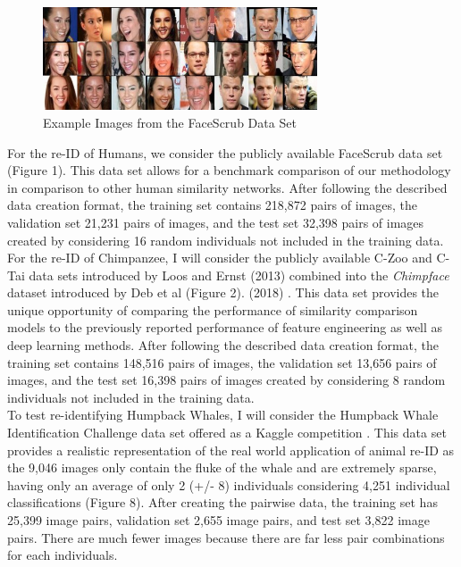 \documentclass[11pt]{article}
\begin{document}
\begin{figure}
  \begin{flushright}
    \includegraphics[width=3.2in]{FaceScrub.jpg}
  \end{flushright}
  \caption{Example Images from the FaceScrub Data Set}
\end{figure}

\noindent
For the re-ID of Humans, we consider the publicly available FaceScrub data set \cite{ng2014data} (Figure 1). This data set allows for a benchmark comparison of our methodology in comparison to other human similarity networks. After following the described data creation format, the training set contains 218,872 pairs of images, the validation set 21,231 pairs of images, and the test set 32,398 pairs of images created by considering 16 random individuals not included in the training data.  
\newline
\\
For the re-ID of Chimpanzee, I will consider the publicly available C-Zoo and C-Tai data sets introduced by Loos and Ernst (2013) combined into the \textit{Chimpface} dataset introduced by Deb et al (Figure 2). (2018) \cite{loos2013automated, deb2018face}. This data set provides the unique opportunity of comparing the performance of similarity comparison models to the previously reported performance of feature engineering as well as deep learning methods. After following the described data creation format, the training set contains 148,516 pairs of images, the validation set 13,656 pairs of images, and the test set 16,398 pairs of images created by considering 8 random individuals not included in the training data.  
\newline
\\
To test re-identifying Humpback Whales, I will consider the Humpback Whale Identification Challenge data set offered as a Kaggle competition \cite{kagglehumpbackreid}. This data set provides a realistic representation of the real world application of animal re-ID as the 9,046 images only contain the fluke of the whale and are extremely sparse, having only an average of only 2 (+/- 8) individuals considering 4,251 individual classifications (Figure 8). After creating the pairwise data, the training set has 25,399 image pairs, validation set 2,655 image pairs, and test set 3,822 image pairs. There are much fewer images because there are far less pair combinations for each individuals.
\newline
\end{document}
